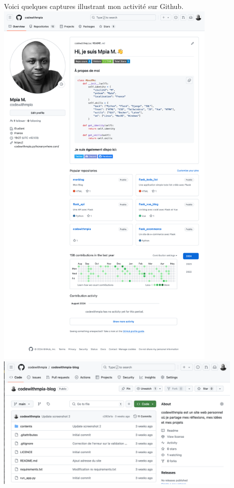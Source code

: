 \documentclass[a4paper,11pt]{article}
\begin{document}
            \newpage
            \noindent Voici quelques captures illustrant mon activité sur Github.\\
            \includegraphics[width=0.8\textwidth]{TP-1/screen1.png}\\
            \includegraphics[width=0.9\textwidth]{TP-1/screen2.png}\\
\end{document}
